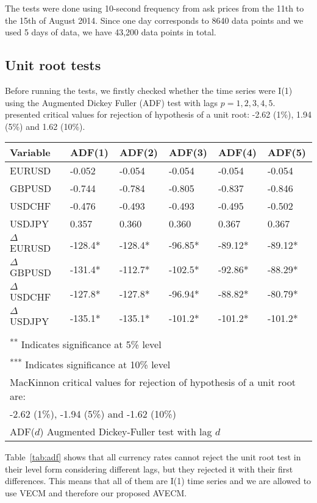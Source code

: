 The tests were done using 10-second frequency from ask prices from the 11th to
the 15th of August 2014. Since one day corresponds to 8640 data points and we
used 5 days of data, we have 43,200 data points in total.

\subsection{Unit root tests} \label{sec:unitroottests}

Before running the tests, we firstly checked whether the time series were I(1)
using the Augmented Dickey Fuller (ADF) test with lags $p=1,2,3,4,5$.
\cite{mackinnon2010} presented critical values for rejection of hypothesis of a
unit root: -2.62 (1\%), 1.94 (5\%) and 1.62 (10\%).
\begin{table*}[ht]
\label{tab:adf}
\centering
\begin{tabular}{llllll}
\toprule
{Variable} & {ADF(1)} & {ADF(2)} & {ADF(3)} & {ADF(4)} & {ADF(5)}\\ 
\midrule
EURUSD &  -0.052   & -0.054  & -0.054  & -0.054  & -0.054  \\
GBPUSD &  -0.744  & -0.784  & -0.805  & -0.837  & -0.846  \\
USDCHF &  -0.476   & -0.493  & -0.493  & -0.495  & -0.502  \\
USDJPY &  0.357   & 0.360  & 0.360  & 0.367  & 0.367  \\
$\Delta$ EURUSD & -128.4*  & -128.4*  & -96.85* & -89.12*   & -89.12*\\
$\Delta$ GBPUSD & -131.4*  & -112.7*  & -102.5* & -92.86*   & -88.29*\\
$\Delta$ USDCHF & -127.8*  & -127.8*  & -96.94* & -88.82*   & -80.79*\\
$\Delta$ USDJPY & -135.1*  & -135.1*  & -101.2* & -101.2*   & -101.2*\\
\bottomrule
\addlinespace[1ex]
\multicolumn{6}{l}{ \textsuperscript{*} Indicates significance at 1\% level} \\
\multicolumn{6}{l}{ \textsuperscript{**} Indicates significance at 5\% level} \\
\multicolumn{6}{l}{ \textsuperscript{***} Indicates significance at 10\% level} \\
\multicolumn{6}{l}{MacKinnon critical values for rejection of hypothesis of a unit root are:}\\
\multicolumn{6}{l}{ -2.62 (1\%), -1.94 (5\%) and -1.62 (10\%)}\\
\multicolumn{6}{l}{ADF($d$) Augmented Dickey-Fuller test with lag $d$} 
\end{tabular}
\caption{Unit roots tests for EURUSD, GBPUSD, USDCHF and USDJPY at 10-second
frequency.}
\end{table*}
Table~\ref{tab:adf} shows that all currency rates cannot reject the unit root
test in their level form considering different lags, but they rejected it with
their first differences. This means that all of them are I(1) time series and we
are allowed to use VECM and therefore our proposed AVECM.

